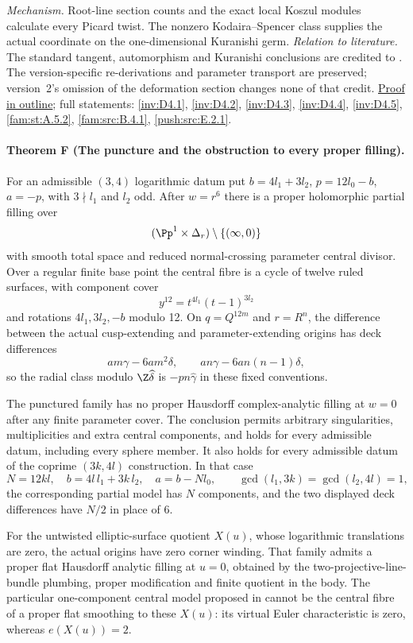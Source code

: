 \textit{Mechanism.} Root-line section counts and the exact local
Koszul modules calculate every Picard twist.  The nonzero
Kodaira--Spencer class supplies the actual coordinate on the
one-dimensional Kuranishi germ.
\textit{Relation to literature.} The standard tangent, automorphism
and Kuranishi conclusions are credited to
\cite[Theorems~1.3--1.4, p.~3; Theorem~6.12, pp.~81--82;
Theorem~6.16, p.~85]{DuEtAl2026v1}.  The version-specific
re-derivations and parameter transport are preserved; version~2's
omission of the deformation section changes none of that credit.
\hyperlink{outline-I-E}{Proof in outline}; full statements:
\ref{inv:D4.1}, \ref{inv:D4.2}, \ref{inv:D4.3},
\ref{inv:D4.4}, \ref{inv:D4.5}, \ref{fam:st:A.5.2},
\ref{fam:src:B.4.1}, \ref{push:src:E.2.1}.

\hypertarget{main-I-F}{}
\paragraph{Theorem F (The puncture and the obstruction to every proper filling).}
\label{series:I:F}
For an admissible $(3,4)$ logarithmic datum put
$b=4l_1+3l_2$, $p=12l_0-b$, $a=-p$, with
$3\nmid l_1$ and $l_2$ odd.  After $w=r^6$ there is a proper
holomorphic partial filling over
\[
 (\Pp^1\times\Delta_r)\setminus\{(\infty,0)\}
\]
with smooth total space and reduced normal-crossing parameter
central divisor.  Over a regular finite base point the central
fibre is a cycle of twelve ruled surfaces, with component cover
\[
 y^{12}=t^{4l_1}(t-1)^{3l_2}
\]
and rotations $4l_1,3l_2,-b$ modulo 12.
On $q=Q^{12m}$ and $r=R^n$, the difference between the actual
cusp-extending and parameter-extending origins has deck
differences
\[
 am\gamma-6am^2\delta,\qquad
 an\gamma-6an(n-1)\delta,
\]
so the radial class modulo $\Z\widehat\delta$ is
$-pn\widehat\gamma$ in these fixed conventions.

The punctured family has no proper Hausdorff complex-analytic
filling at $w=0$ after any finite parameter cover.  The conclusion
permits arbitrary singularities, multiplicities and extra central
components, and holds for every admissible datum, including every
sphere member.  It also holds for every admissible datum of the
coprime $(3k,4l)$ construction.  In that case
\[
 N=12kl,\quad b=4l\,l_1+3k\,l_2,\quad a=b-Nl_0,
 \qquad \gcd(l_1,3k)=\gcd(l_2,4l)=1,
\]
the corresponding partial model has $N$ components, and the two
displayed deck differences have $N/2$ in place of 6.

For the untwisted elliptic-surface quotient $X(u)$, whose
logarithmic translations are zero, the actual origins have zero
corner winding.  That family admits a proper flat Hausdorff
analytic filling at $u=0$, obtained by the two-projective-line-bundle
plumbing, proper modification and finite quotient in the body.
The particular one-component central model proposed in
\cite[Conjecture~8.2, p.~22]{Engel2026} cannot be the central
fibre of a proper flat smoothing to these $X(u)$: its virtual
Euler characteristic is zero, whereas $e(X(u))=2$.

